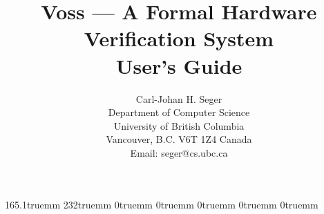 
\makeindex

\textwidth 165.1truemm
\textheight 232truemm
\oddsidemargin  0truemm
\evensidemargin 0truemm
\topmargin 0truemm
\headheight 0truemm
\headsep 0truemm

\title{Voss --- A Formal Hardware Verification System\\
User's Guide\\
\mbox{}
}

\author{
\parbox[t]{3.0in}{%
\begin{center}
Carl-Johan H. Seger\\
Department of Computer Science\\
University of British Columbia\\
Vancouver, B.C. V6T 1Z4 Canada \\
Email: seger@cs.ubc.ca
\end{center}}}









